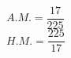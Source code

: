 \begin{enumerate}[label = \Alph*. ]
\begin{multicols}{2}
\begin{enumerate}[label = \arabic*. ]
$A.M. =  \dfrac{17}{225} $\\
$H.M. = \dfrac{225}{17} $\\

\end{enumerate}

\end{multicols}
\end{enumerate}